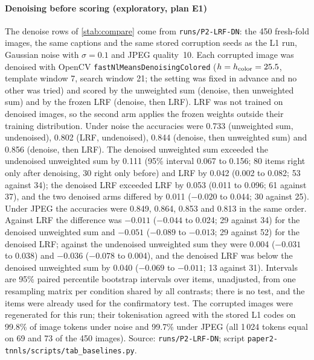 \documentclass[journal,onecolumn]{IEEEtran}
\theoremstyle{plain}
\begin{document}
\paragraph*{Denoising before scoring (exploratory, plan E1)}
The denoise rows of \cref{stab:compare} come from \nolinkurl{runs/P2-LRF-DN}: the 450 fresh-fold images, the same captions and the same stored corruption seeds as the L1 run, Gaussian noise with $\sigma=0.1$ and JPEG quality~10.
Each corrupted image was denoised with OpenCV \texttt{fastNlMeansDenoisingColored} ($h=h_{\rm color}=25.5$, template window 7, search window 21; the setting was fixed in advance and no other was tried) and scored by the unweighted sum (denoise, then unweighted sum) and by the frozen LRF (denoise, then LRF).
LRF was not trained on denoised images, so the second arm applies the frozen weights outside their training distribution.
Under noise the accuracies were 0.733 (unweighted sum, undenoised), 0.802 (LRF, undenoised), 0.844 (denoise, then unweighted sum) and 0.856 (denoise, then LRF).
The denoised unweighted sum exceeded the undenoised unweighted sum by 0.111 (95\% interval 0.067 to 0.156; 80 items right only after denoising, 30 right only before) and LRF by 0.042 (0.002 to 0.082; 53 against 34); the denoised LRF exceeded LRF by 0.053 (0.011 to 0.096; 61 against 37), and the two denoised arms differed by 0.011 ($-0.020$ to 0.044; 30 against 25).
Under JPEG the accuracies were 0.849, 0.864, 0.853 and 0.813 in the same order.
Against LRF the difference was $-0.011$ ($-0.044$ to 0.024; 29 against 34) for the denoised unweighted sum and $-0.051$ ($-0.089$ to $-0.013$; 29 against 52) for the denoised LRF; against the undenoised unweighted sum they were 0.004 ($-0.031$ to 0.038) and $-0.036$ ($-0.078$ to 0.004), and the denoised LRF was below the denoised unweighted sum by 0.040 ($-0.069$ to $-0.011$; 13 against 31).
Intervals are 95\% paired percentile bootstrap intervals over items, unadjusted, from one resampling matrix per condition shared by all contrasts; there is no test, and the items were already used for the confirmatory test.
The corrupted images were regenerated for this run; their tokenisation agreed with the stored L1 codes on 99.8\% of image tokens under noise and 99.7\% under JPEG (all 1\,024 tokens equal on 69 and 73 of the 450 images).
Source: \nolinkurl{runs/P2-LRF-DN}; script \nolinkurl{paper2-tnnls/scripts/tab_baselines.py}.
\end{document}
